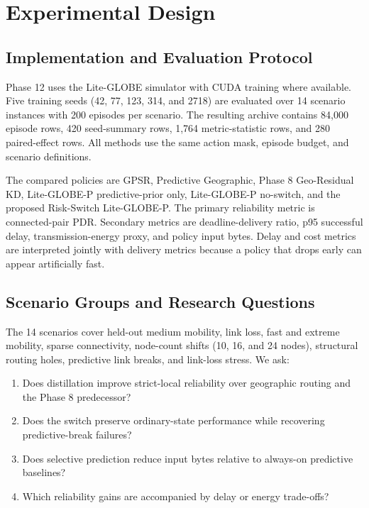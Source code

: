 \documentclass[drones,article,submit,moreauthors]{Definitions/mdpi}
\begin{document}
\section{Experimental Design}

\subsection{Implementation and Evaluation Protocol}

Phase 12 uses the Lite-GLOBE simulator with CUDA training where available. Five training seeds (42, 77, 123, 314, and 2718) are evaluated over 14 scenario instances with 200 episodes per scenario. The resulting archive contains 84,000 episode rows, 420 seed-summary rows, 1,764 metric-statistic rows, and 280 paired-effect rows. All methods use the same action mask, episode budget, and scenario definitions.

The compared policies are GPSR, Predictive Geographic, Phase 8 Geo-Residual KD, Lite-GLOBE-P predictive-prior only, Lite-GLOBE-P no-switch, and the proposed Risk-Switch Lite-GLOBE-P. The primary reliability metric is connected-pair PDR. Secondary metrics are deadline-delivery ratio, p95 successful delay, transmission-energy proxy, and policy input bytes. Delay and cost metrics are interpreted jointly with delivery metrics because a policy that drops early can appear artificially fast.

\subsection{Scenario Groups and Research Questions}

The 14 scenarios cover held-out medium mobility, link loss, fast and extreme mobility, sparse connectivity, node-count shifts (10, 16, and 24 nodes), structural routing holes, predictive link breaks, and link-loss stress. We ask:
\begin{enumerate}[leftmargin=*]
    \item Does distillation improve strict-local reliability over geographic routing and the Phase 8 predecessor?
    \item Does the switch preserve ordinary-state performance while recovering predictive-break failures?
    \item Does selective prediction reduce input bytes relative to always-on predictive baselines?
    \item Which reliability gains are accompanied by delay or energy trade-offs?
\end{enumerate}
\end{document}
